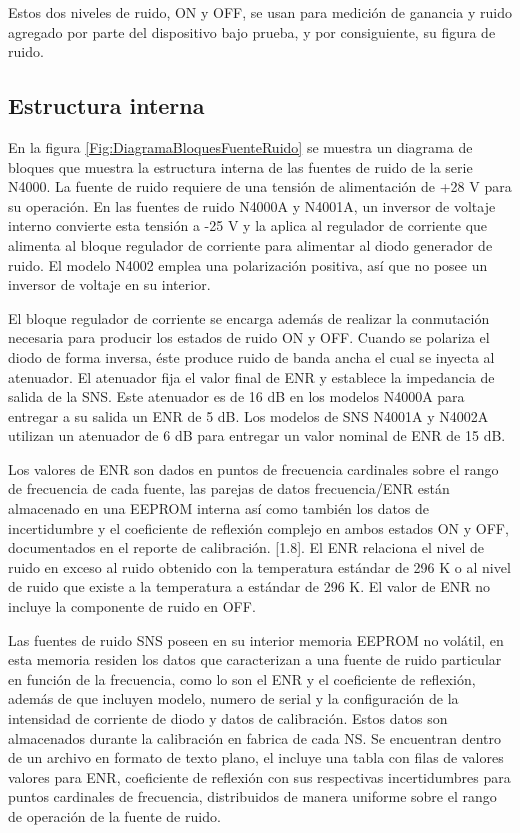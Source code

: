 	Estos dos niveles de ruido, ON y OFF, se usan para medición de ganancia y ruido agregado por parte del dispositivo bajo prueba, y por consiguiente, su figura de ruido.	
	
	\subsection{Estructura interna}
			
	En la figura \ref{Fig:DiagramaBloquesFuenteRuido} se muestra un diagrama de bloques que muestra la estructura interna de las fuentes de ruido de la serie N4000. La fuente de ruido requiere de una tensión de alimentación de +28 \si{\volt} para su operación. En las fuentes de ruido N4000A y N4001A, un inversor de voltaje interno convierte esta tensión a -25 \si{\volt} y la aplica al regulador de corriente que alimenta al bloque regulador de corriente para alimentar al diodo generador de ruido. El modelo N4002 emplea una polarización positiva, así que no posee un inversor de voltaje en su interior.
	
	El bloque regulador de corriente se encarga además de realizar la conmutación necesaria para producir los estados de ruido ON y OFF. Cuando se polariza el diodo de forma inversa, éste produce ruido de banda ancha el cual se inyecta al atenuador. El atenuador fija el valor final de ENR y establece la impedancia de salida de la SNS. Este atenuador es de 16 dB en los modelos N4000A para entregar a  su salida un ENR de 5 dB. Los modelos de SNS N4001A y N4002A utilizan un atenuador de 6 dB para entregar un valor nominal de ENR de 15 dB.		

	Los valores de ENR son dados en puntos de frecuencia cardinales sobre el rango de frecuencia de cada fuente, las parejas de datos frecuencia/ENR están almacenado en una EEPROM interna así como también los datos de incertidumbre y el coeficiente de reflexión complejo en ambos estados ON y OFF, documentados en el reporte de calibración. [1.8]. El ENR relaciona el nivel de ruido en exceso al ruido obtenido con la temperatura estándar de 296 K o al nivel de ruido que existe a la temperatura a estándar de 296 K. El valor de ENR no incluye la componente de ruido en OFF. 
	
	Las fuentes de ruido SNS poseen en su interior memoria EEPROM no volátil, en esta memoria residen los datos que caracterizan a una fuente de ruido particular en función de la frecuencia, como lo son el ENR y el coeficiente de reflexión, además de que incluyen modelo, numero de serial y la configuración de la intensidad de corriente de diodo y datos de calibración. Estos datos son almacenados  durante la calibración en fabrica de cada NS. Se encuentran dentro de un archivo en formato de texto plano, el incluye una tabla con filas de valores valores para ENR, coeficiente de reflexión con sus respectivas incertidumbres para puntos cardinales de frecuencia, distribuidos de manera uniforme sobre el rango de operación de la fuente de ruido. 	


